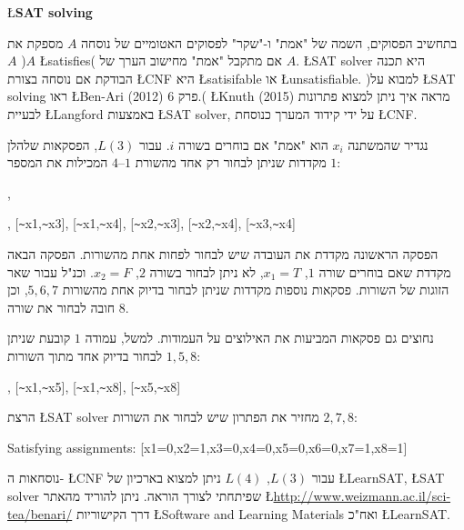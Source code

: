 \documentclass[12pt,a4paper]{article}
\begin{document}

\begin{center}
\L{\textbf{\Large SAT solving}}
\end{center}

בתחשיב הפסוקים, השמה של "אמת" ו-"שקר" לפסוקים האטומיים של נוסחה
$A$
מספקת את
$A$
)$A$ \L{satisfies}(
אם מתקבל "אמת" מחישוב הערך של
$A$.
\L{SAT solver}
היא תכנה הבודקת אם נוסחה בצורת
\L{CNF}
היא
\L{satisifable}
או
\L{unsatisfiable}.
)למבוא על
\L{SAT solving}
ראו
\L{Ben-Ari (2012)}
פרק 6.(
\L{Knuth (2015)}
מראה איך ניתן למצוא פתרונות לבעיית
\L{Langford}
באמצעות
\L{SAT solver},
על ידי קידוד המערך כנוסחת
\L{CNF}.

נגדיר שהמשתנה
$x_i$
הוא "אמת" אם בוחרים בשורה
$i$.
עבור
$L(3)$,
הפסקאות שלהלן מקדדות שניתן לבחור רק אחד מהשורת 
$1$--$4$
המכילות את המספר
$1$:

\begin{ttfamily}
  [x1,x2,x3,x4],\par
  [\verb+~+x1,\verb+~+x2], [\verb+~+x1,\verb+~+x3], [\verb+~+x1,\verb+~+x4], [\verb+~+x2,\verb+~+x3], [\verb+~+x2,\verb+~+x4], [\verb+~+x3,\verb+~+x4]
\end{ttfamily}

הפסקה הראשונה מקדדת את העובדה שיש לבחור לפחות אחת מהשורות. הפסקה הבאה מקדדת שאם בוחרים שורה
$1$,
$x_1=T$,
לא ניתן לבחור בשורה
$2$,
$x_2=F$.
וכנ"ל עבור שאר הזוגות של השורות. פסקאות נוספות מקדדות שניתן לבחור בדיוק אחת מהשורות
$5,6,7$,
וכן חובה לבחור את שורה
$8$.

נחוצים גם פסקאות המביעות את האילוצים על העמודות. למשל, עמודה
$1$
קובעת שניתן לבחור בדיוק אחד מתוך השורות
$1,5,8$:

\begin{ttfamily}
  [x1,x5,x8], [\verb+~+x1,\verb+~+x5], [\verb+~+x1,\verb+~+x8], [\verb+~+x5,\verb+~+x8]
\end{ttfamily}

הרצת
\L{SAT solver}
מחזיר את הפתרון שיש לבחור את השורות
$2,7,8$:

\begin{ttfamily}
Satisfying assignments: [x1=0,x2=1,x3=0,x4=0,x5=0,x6=0,x7=1,x8=1]
\end{ttfamily}

\bigskip


נוסחאות ה-
\L{CNF}
עבור
$L(3)$, $L(4)$
ניתן למצוא בארכיון של
\L{LearnSAT}, \L{SAT solver}
שפיתחתי לצורך הוראה. ניתן להוריד מהאתר
\L{\url{http://www.weizmann.ac.il/sci-tea/benari/}}
דרך הקישוריות
\L{Software and Learning Materials}
ואח"כ
\L{LearnSAT}.
\end{document}
